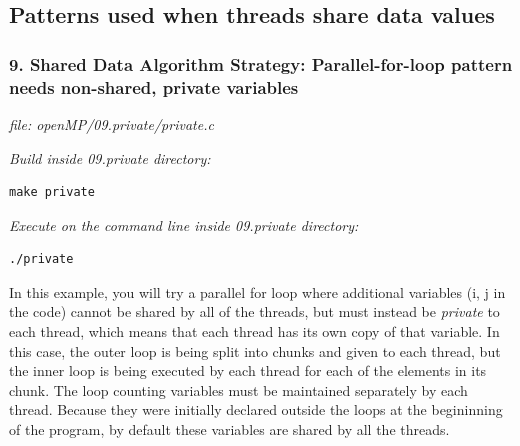 \documentclass[letterpaper,10pt,openany,oneside]{sphinxmanual}
\begin{document}
\subsection{Patterns used when threads share data values}
\label{SharedMemory/MutualExclusion:patterns-used-when-threads-share-data-values}\label{SharedMemory/MutualExclusion::doc}

\subsubsection{9. Shared Data Algorithm Strategy: Parallel-for-loop pattern needs non-shared, private variables}
\label{SharedMemory/MutualExclusion:shared-data-algorithm-strategy-parallel-for-loop-pattern-needs-non-shared-private-variables}
\emph{file: openMP/09.private/private.c}

\emph{Build inside 09.private directory:}

\begin{Verbatim}[commandchars=\\\{\}]
make private
\end{Verbatim}

\emph{Execute on the command line inside 09.private directory:}

\begin{Verbatim}[commandchars=\\\{\}]
./private
\end{Verbatim}

In this example, you will try a parallel for loop where additional variables (i, j in the code) cannot be shared by all of the threads, but must instead be \emph{private} to each thread, which means that each thread has its own copy of that variable.  In this case, the outer loop is being split into chunks and given to each thread, but the inner loop is being executed by each thread for each of the elements in its chunk.  The loop counting variables must be maintained separately by each thread.  Because they were initially declared outside the loops at the begininning of the program, by default these variables are shared by all the threads.
\end{document}
